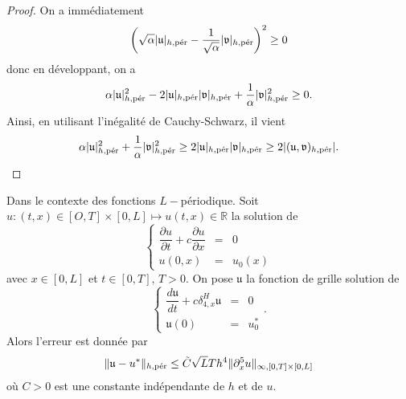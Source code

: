 \begin{proof}
On a immédiatement
\begin{equation}
\left( \sqrt{\alpha} |\mathfrak{u}|_{h,\per} - \dfrac{1}{\sqrt{\alpha}} |\mathfrak{v}|_{h,\per} \right)^2 \geq 0
\end{equation}
donc en développant, on a
\begin{equation}
\alpha |\mathfrak{u}|_{h,\per}^2 - 2 |\mathfrak{u}|_{h,\per} |\mathfrak{v}|_{h,\per} + \dfrac{1}{\alpha} |\mathfrak{v}|_{h,\per}^2 \geq 0.
\end{equation}
Ainsi, en utilisant l'inégalité de Cauchy-Schwarz, il vient
\begin{equation}
\alpha |\mathfrak{u}|_{h,\per}^2 + \dfrac{1}{\alpha} |\mathfrak{v}|_{h,\per}^2 \geq 2 |\mathfrak{u}|_{h,\per} |\mathfrak{v}|_{h,\per} \geq 2|(\mathfrak{u}, \mathfrak{v})_{h,\per}|.
\end{equation}
\end{proof}







\begin{proposition}
Dans le contexte des fonctions $L-$périodique.
Soit $u : (t,x) \in [O, T] \times [0,L] \mapsto u(t,x) \in \mathbb{R}$ la solution de 
\begin{equation}
\left\lbrace
\begin{array}{rcl}
\dfrac{\partial u}{\partial t} + c \dfrac{\partial u}{\partial x} & = & 0\\
u(0,x) & = & u_0(x) 
\end{array}
\right.
\end{equation}
avec $x \in [0,L]$ et $t \in [0,T]$, $T>0$.
On pose $\mathfrak{u}$ la fonction de grille solution de 
\begin{equation}
\left\lbrace
\begin{array}{rcl}
\dfrac{d \mathfrak{u}}{dt} + c \delta_{4,x}^H \mathfrak{u} & = & 0\\
\mathfrak{u}(0) & = & u_0^* 
\end{array}
\right. .
\end{equation}
Alors l'erreur est donnée par
\begin{equation}
\| \mathfrak{u} - u^* \|_{h,\per} \leq \tilde{C} \sqrt{L} T h^4 \| \partial^5_x u \|_{\infty,[0,T] \times [0,L]}
\end{equation}
où $C>0$ est une constante indépendante de $h$ et de $u$.
\end{proposition}

